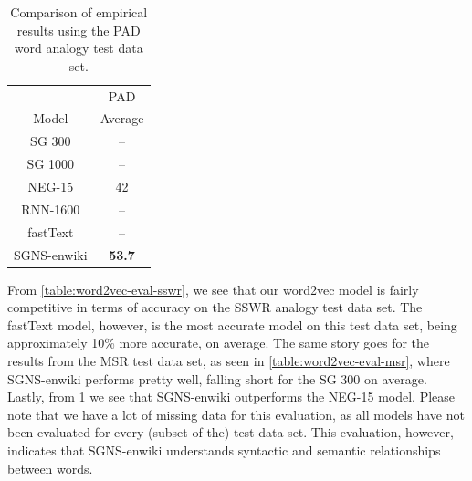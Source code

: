 \begin{table}[H]
    \centering
    \begin{tabular}{@{}cc@{}}
    \toprule
    & PAD \\
    \cmidrule(l){2-2}
    \multirow{-2}{*}{Model} & Average \\
    \midrule
    \trcolor
    SG 300 & -- \\
    SG 1000 & -- \\
    \trcolor
    NEG-15 & 42 \\
    RNN-1600 & -- \\
    \trcolor
    fastText & -- \\
    SGNS-enwiki & \textbf{53.7} \\
    \bottomrule
    \end{tabular}
    \caption{Comparison of empirical results using the PAD word analogy test data set.}
    \label{table:word2vec-eval-pad}
\end{table}

From \cref{table:word2vec-eval-sswr}, we see that our word2vec model is fairly competitive in terms of accuracy on the SSWR analogy test data set. The fastText model, however, is the most accurate model on this test data set, being approximately 10\% more accurate, on average. The same story goes for the results from the MSR test data set, as seen in \cref{table:word2vec-eval-msr}, where SGNS-enwiki performs pretty well, falling short for the SG 300 on average. Lastly, from \cref{table:word2vec-eval-pad} we see that SGNS-enwiki outperforms the NEG-15 model. Please note that we have a lot of missing data for this evaluation, as all models have not been evaluated for every (subset of the) test data set. This evaluation, however, indicates that SGNS-enwiki understands syntactic and semantic relationships between words.

